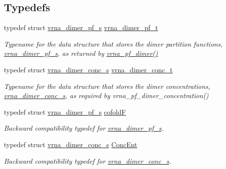 \subsection*{Typedefs}
\begin{DoxyCompactItemize}
\item 
typedef struct \hyperlink{group__pf__cofold_structvrna__dimer__pf__s}{vrna\+\_\+dimer\+\_\+pf\+\_\+s} \hyperlink{group__pf__cofold_ga444df1587c9a2ca15b8eb25188f629c3}{vrna\+\_\+dimer\+\_\+pf\+\_\+t}\hypertarget{group__pf__cofold_ga444df1587c9a2ca15b8eb25188f629c3}{}\label{group__pf__cofold_ga444df1587c9a2ca15b8eb25188f629c3}

\begin{DoxyCompactList}\small\item\em Typename for the data structure that stores the dimer partition functions, \hyperlink{group__pf__cofold_structvrna__dimer__pf__s}{vrna\+\_\+dimer\+\_\+pf\+\_\+s}, as returned by \hyperlink{group__pf__cofold_ga4e5c7d06c302a7c59fc0d64dc142ca63}{vrna\+\_\+pf\+\_\+dimer()} \end{DoxyCompactList}\item 
typedef struct \hyperlink{group__pf__cofold_structvrna__dimer__conc__s}{vrna\+\_\+dimer\+\_\+conc\+\_\+s} \hyperlink{group__pf__cofold_gac48c2723444ecfdceafcfd525ca98322}{vrna\+\_\+dimer\+\_\+conc\+\_\+t}\hypertarget{group__pf__cofold_gac48c2723444ecfdceafcfd525ca98322}{}\label{group__pf__cofold_gac48c2723444ecfdceafcfd525ca98322}

\begin{DoxyCompactList}\small\item\em Typename for the data structure that stores the dimer concentrations, \hyperlink{group__pf__cofold_structvrna__dimer__conc__s}{vrna\+\_\+dimer\+\_\+conc\+\_\+s}, as required by vrna\+\_\+pf\+\_\+dimer\+\_\+concentration() \end{DoxyCompactList}\item 
typedef struct \hyperlink{group__pf__cofold_structvrna__dimer__pf__s}{vrna\+\_\+dimer\+\_\+pf\+\_\+s} \hyperlink{group__pf__cofold_ga5445d8d96a40e9e79b1fa5a7f1a6b7ea}{cofoldF}\hypertarget{group__pf__cofold_ga5445d8d96a40e9e79b1fa5a7f1a6b7ea}{}\label{group__pf__cofold_ga5445d8d96a40e9e79b1fa5a7f1a6b7ea}

\begin{DoxyCompactList}\small\item\em Backward compatibility typedef for \hyperlink{group__pf__cofold_structvrna__dimer__pf__s}{vrna\+\_\+dimer\+\_\+pf\+\_\+s}. \end{DoxyCompactList}\item 
typedef struct \hyperlink{group__pf__cofold_structvrna__dimer__conc__s}{vrna\+\_\+dimer\+\_\+conc\+\_\+s} \hyperlink{group__pf__cofold_ga46244c7adf5040580291c45b465f4efa}{Conc\+Ent}\hypertarget{group__pf__cofold_ga46244c7adf5040580291c45b465f4efa}{}\label{group__pf__cofold_ga46244c7adf5040580291c45b465f4efa}

\begin{DoxyCompactList}\small\item\em Backward compatibility typedef for \hyperlink{group__pf__cofold_structvrna__dimer__conc__s}{vrna\+\_\+dimer\+\_\+conc\+\_\+s}. \end{DoxyCompactList}\end{DoxyCompactItemize}
